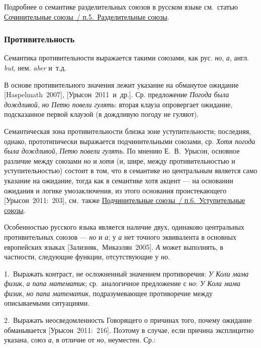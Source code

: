 Подробнее о семантике разделительных союзов в русском языке см.~статью
\underline{Сочинительные союзы~/ п.5.~Разделительные союзы}.

\subsubsection{Противительность}\label{ux43fux440ux43eux442ux438ux432ux438ux442ux435ux43bux44cux43dux43eux441ux442ux44c}

Семантика противительности выражается такими союзами, как рус.
\textit{но}, \textit{а}, англ. \textit{but}, нем. \textit{aber} и~т.д.

В основе противительного значения лежит указание на обманутое ожидание
{[}Haspelmath~2007{]}, {[}Урысон~2011~и~др.{]}. Ср. предложение
\textit{Погода была дождливой}, \textit{но Петю повели гулять}: вторая
клауза опровергает ожидание, подсказанное первой клаузой (в дождливую
погоду не гуляют).

Семантическая зона противительности близка зоне уступительности;
последняя, однако, прототипически выражается подчинительными союзами,
ср. \textit{Хотя погода была дождливой}, \textit{Петю повели гулять}. По
мнению Е.~В.~Урысон, основное различие между союзами \textit{но} и
\textit{хотя} (и, шире, между противительностью и уступительностью)
состоит в том, что в семантике но центральным является само указание на
ожидание, тогда как в семантике хотя акцент --- на основании ожидания и
логике умозаключения, из этого основания проистекающего
{[}Урысон~2011:~203{]}, см.~также \underline{Подчинительные союзы~/
п.6.~Уступительные союзы}.

Особенностью русского языка является наличие двух, одинаково центральных
противительных союзов --- \textit{но} и \textit{а}; у \textit{а} нет точного
эквивалента в основных европейских языках {[}Зализняк,~Микаэлян~2005{]}.
\textit{А} может выполнять, в частности, следующие функции, отсутствующие
у \textit{но}.

1.~Выражать контраст, не осложненный значением противоречия: \textit{У
Коли мама физик}, \textit{а папа математик}; ср.~аналогичное предложение с
\textit{но}: \textit{У Коли мама физик}, \textit{но папа математик},
подразумевающее противоречие между описываемыми ситуациями.

2.~Выражать неосведомленность Говорящего о причинах того, почему
ожидание обманывается {[}Урысон~2011:~216{]}. Поэтому в случае, если
причина эксплицитно указана, союз \textit{а}, в отличие от \textit{но},
неуместен. Ср.:

